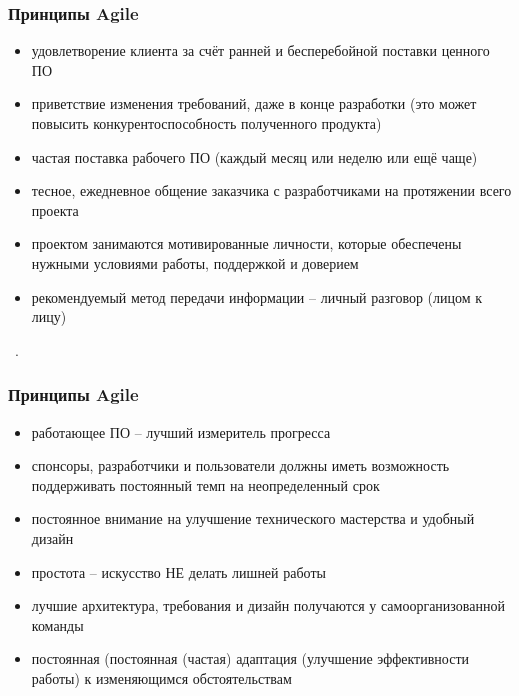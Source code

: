 \documentclass{../industrial-development}
\begin{document}

\begin{frame} \frametitle{Принципы Agile}
	\begin{itemize}
	\item удовлетворение клиента за счёт ранней и бесперебойной поставки ценного ПО 
	\item приветствие изменения требований, даже в конце разработки (это может повысить конкурентоспособность полученного продукта) 
	\item частая поставка рабочего ПО (каждый месяц или неделю или ещё чаще)
	\item тесное, ежедневное общение заказчика с разработчиками на протяжении всего проекта
	\item проектом занимаются мотивированные личности, которые обеспечены нужными условиями работы, поддержкой и доверием
	\item рекомендуемый метод передачи информации – личный разговор (лицом к лицу)
	\end{itemize}	
\end{frame}

\lecturenotes
~\cite{Fowler}.



\begin{frame} \frametitle{Принципы Agile}
	\begin{itemize}
	\item работающее ПО – лучший измеритель прогресса 
	\item спонсоры, разработчики и пользователи должны иметь возможность поддерживать постоянный темп на неопределенный срок 
	\item постоянное внимание на улучшение технического мастерства и удобный дизайн 
	\item простота – искусство НЕ делать лишней работы 
	\item лучшие архитектура, требования и дизайн получаются у самоорганизованной команды 
	\item постоянная (постоянная (частая) адаптация (улучшение эффективности работы) к изменяющимся обстоятельствам
	\end{itemize}	
\end{frame}
\end{document}
